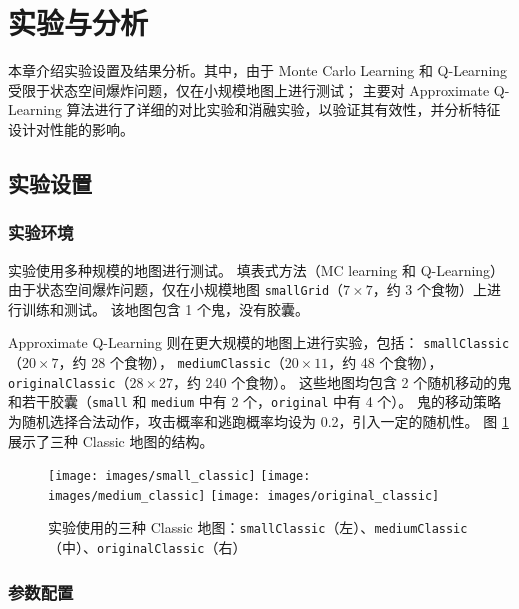\section{实验与分析}

本章介绍实验设置及结果分析。其中，由于 Monte Carlo Learning 和 Q-Learning 受限于状态空间爆炸问题，仅在小规模地图上进行测试；
主要对 Approximate Q-Learning 算法进行了详细的对比实验和消融实验，以验证其有效性，并分析特征设计对性能的影响。

\subsection{实验设置}

\subsubsection{实验环境}

实验使用多种规模的地图进行测试。
填表式方法（MC learning 和 Q-Learning）由于状态空间爆炸问题，仅在小规模地图 \texttt{smallGrid}（$7 \times 7$，约 3 个食物）上进行训练和测试。
该地图包含 1 个鬼，没有胶囊。

Approximate Q-Learning 则在更大规模的地图上进行实验，包括：
\texttt{smallClassic}（$20 \times 7$，约 28 个食物），
\texttt{mediumClassic}（$20 \times 11$，约 48 个食物），
\texttt{originalClassic}（$28 \times 27$，约 240 个食物）。
这些地图均包含 2 个随机移动的鬼和若干胶囊（\texttt{small} 和 \texttt{medium} 中有 2 个，\texttt{original} 中有 4 个）。
鬼的移动策略为随机选择合法动作，攻击概率和逃跑概率均设为 0.2，引入一定的随机性。
图 \ref{fig:classic_layouts} 展示了三种 Classic 地图的结构。

\begin{figure}[htbp]
    \centering
    \texttt{[image: images/small\_classic]}
    \hfill
    \texttt{[image: images/medium\_classic]}
    \hfill
    \texttt{[image: images/original\_classic]}
    
    \vspace{0.3cm}
    
    \caption{实验使用的三种 Classic 地图：\texttt{smallClassic}（左）、\texttt{mediumClassic}（中）、\texttt{originalClassic}（右）}
    \label{fig:classic_layouts}
\end{figure}

\subsubsection{参数配置}

